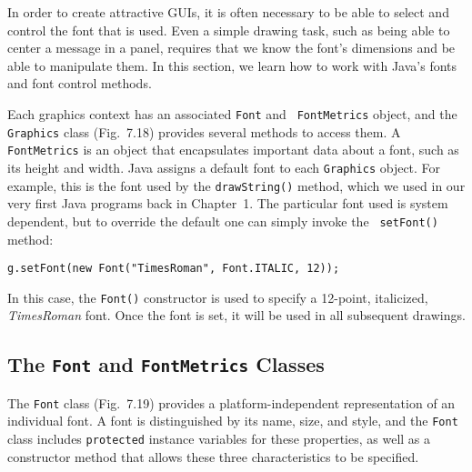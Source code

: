
\noindent In order to create attractive GUIs, it is often necessary to
be able to select and control the font that is used.  Even a simple
drawing task, such as being able to center a message in a panel,
requires that we know the font's dimensions and be able to manipulate
them.  In this section, we learn how to work with Java's fonts and
font control methods.

Each graphics context has an associated {\tt Font} and {\tt
FontMetrics} object, and the {\tt Graphics} class
(Fig.~7.18) provides several methods to access them.
A {\tt FontMetrics} is an object that encapsulates important data
about a font, such as its height and width.  Java assigns a default
font to each {\tt Graphics} object.  For example, this is the font
used by the {\tt drawString()} method, which we used in our very first
Java programs back in Chapter~1.  The particular font used is system
dependent, but to override the default one can simply invoke the {\tt
setFont()} method:

\begin{jjjlisting}
\begin{lstlisting}
g.setFont(new Font("TimesRoman", Font.ITALIC, 12));
\end{lstlisting}
\end{jjjlisting}

\noindent In this case, the {\tt Font()} constructor is used
to specify a 12-point, italicized, {\it TimesRoman} font.  Once the
font is set, it will be used in all subsequent drawings.

\subsection{The {\tt Font} and {\tt FontMetrics} Classes}
\noindent The {\tt Font} class (Fig.~7.19) provides a
platform-independent representation of an individual font.  A font is
distinguished by its name, size, and style, and the {\tt Font} class
includes {\tt protected} instance variables for these properties, as
well as a constructor method that allows these three characteristics
to be specified. 



